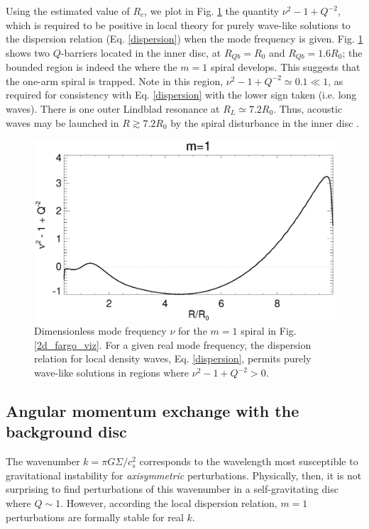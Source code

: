 
Using the estimated value of $R_c$, we plot in
Fig. \ref{fargo_qbarrier} the quantity $\nu^2 - 1 + Q^{-2}$, which is
required to be positive in local theory for purely wave-like
solutions to the dispersion relation (Eq. \ref{dispersion}) when the
mode frequency is given. %
Fig. \ref{fargo_qbarrier} shows two $Q$-barriers located in
the inner disc, at $R_{Qb}=R_0$ and $R_{Qb}=1.6R_0$; the bounded region is indeed the
where the $m=1$ spiral develops. This suggests that the one-arm 
spiral is trapped. Note in this region, $\nu^2 - 1 + 
Q^{-2}\simeq 0.1\ll 1$, as required for consistency with
Eq. \ref{dispersion} with the lower sign taken (i.e. long waves).  
There is one outer Lindblad resonance at $R_L\simeq
7.2R_0$. Thus, acoustic waves may be launched in $R\gtrsim 7.2R_0$ by
the spiral disturbance in the inner disc \citep{lin11b}. 

\begin{figure}
  \includegraphics[width=\linewidth]{figures/m1_analysis_Qbar_fargo.ps} 
  \caption{Dimensionless mode frequency $\nu$ for the $m=1$ spiral in
    Fig. \ref{2d_fargo_viz}. For a given real mode frequency, the
    dispersion relation for local density waves, Eq. \ref{dispersion},
    permits purely wave-like solutions in regions where $\nu^2 - 1 +
    Q^{-2}>0$.    
    \label{fargo_qbarrier}} 
\end{figure}

\subsection{Angular momentum exchange with the background disc}  
The wavenumber $k = \pi G\Sigma/c_s^2$ corresponds to the
wavelength most susceptible to gravitational instability for
\emph{axisymmetric} perturbations. Physically, then, it is not
surprising to find perturbations of this wavenumber in a
self-gravitating disc where $Q\sim 1$. However, according the
local dispersion relation, $m=1$ perturbations are formally stable for 
real $k$.  

